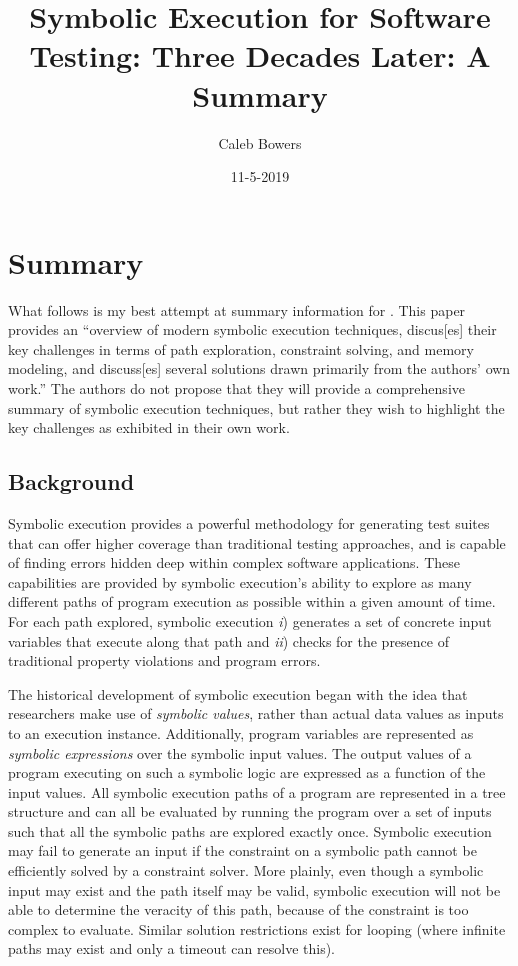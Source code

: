 \documentclass[11pt, journal]{IEEEtran}
\title{Symbolic Execution for Software Testing: Three Decades Later: A Summary}
\author{Caleb Bowers}
\date{11-5-2019}
\begin{document}
\maketitle

\section{Summary}
What follows is my best attempt at summary information for \cite{Cadar2013}. This paper provides an ``overview of modern symbolic execution techniques, discus[es] their key challenges in terms of path exploration, constraint solving, and memory modeling, and discuss[es] several solutions drawn primarily from the authors' own work.'' The authors do not propose that they will provide a comprehensive summary of symbolic execution techniques, but rather they wish to highlight the key challenges as exhibited in their own work.
\subsection{Background}
Symbolic execution provides a powerful methodology for generating test suites that can offer higher coverage than traditional testing approaches, and is capable of finding errors hidden deep within complex software applications. These capabilities are provided by symbolic execution's ability to explore as many different paths of program execution as possible within a given amount of time. For each path explored, symbolic execution \textit{i}) generates a set of concrete input variables that execute along that path and \textit{ii}) checks for the presence of traditional property violations and program errors.

The historical development of symbolic execution began with the idea that researchers make use of \textit{symbolic values}, rather than actual data values as inputs to an execution instance. Additionally, program variables are represented as \textit{symbolic expressions} over the symbolic input values. The output values of a program executing on such a symbolic logic are expressed as a function of the input values. All symbolic execution paths of a program are represented in a tree structure and can all be evaluated by running the program over a set of inputs such that all the symbolic paths are explored exactly once. Symbolic execution may fail to generate an input if the constraint on a symbolic path cannot be efficiently solved by a constraint solver. More plainly, even though a symbolic input may exist and the path itself may be valid, symbolic execution will not be able to determine the veracity of this path, because of the constraint is too complex to evaluate. Similar solution restrictions exist for looping (where infinite paths may exist and only a timeout can resolve this).
\end{document}
